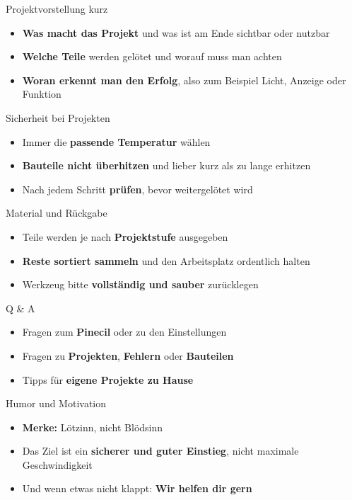 \begin{frame}{Projektvorstellung kurz}
\begin{itemize}\setlength{\itemsep}{3mm}
  \item \textbf{Was macht das Projekt} und was ist am Ende sichtbar oder nutzbar
  \item \textbf{Welche Teile} werden gelötet und worauf muss man achten
  \item \textbf{Woran erkennt man den Erfolg}, also zum Beispiel Licht, Anzeige oder Funktion
\end{itemize}
\end{frame}

\begin{frame}{Sicherheit bei Projekten}
\begin{itemize}\setlength{\itemsep}{3mm}
  \item Immer die \textbf{passende Temperatur} wählen
  \item \textbf{Bauteile nicht überhitzen} und lieber kurz als zu lange erhitzen
  \item Nach jedem Schritt \textbf{prüfen}, bevor weitergelötet wird
\end{itemize}
\end{frame}

\begin{frame}{Material und Rückgabe}
\begin{itemize}\setlength{\itemsep}{3mm}
  \item Teile werden je nach \textbf{Projektstufe} ausgegeben
  \item \textbf{Reste sortiert sammeln} und den Arbeitsplatz ordentlich halten
  \item Werkzeug bitte \textbf{vollständig und sauber} zurücklegen
\end{itemize}
\end{frame}

\begin{frame}{Q \& A}
\begin{itemize}\setlength{\itemsep}{3mm}
  \item Fragen zum \textbf{Pinecil} oder zu den Einstellungen
  \item Fragen zu \textbf{Projekten}, \textbf{Fehlern} oder \textbf{Bauteilen}
  \item Tipps für \textbf{eigene Projekte zu Hause}
\end{itemize}
\end{frame}

\begin{frame}{Humor und Motivation}
\begin{itemize}\setlength{\itemsep}{3mm}
  \item \textbf{Merke:} Lötzinn, nicht Blödsinn
  \item Das Ziel ist ein \textbf{sicherer und guter Einstieg}, nicht maximale Geschwindigkeit
  \item Und wenn etwas nicht klappt: \textbf{Wir helfen dir gern}
\end{itemize}
\end{frame}




